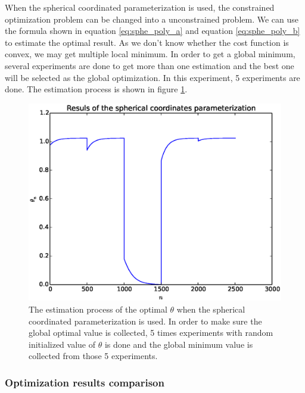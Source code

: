 \documentclass[a4paper,12pt]{article}
\begin{document}
When the spherical coordinated parameterization is used, the constrained optimization problem can be changed into a unconstrained problem. We can use the formula shown in equation \ref{eq:sphe_poly_a} and equation \ref{eq:sphe_poly_b} to estimate the optimal result. As we don't know whether the cost function is convex, we may get multiple local minimum. In order to get a global minimum, several experiments are done to get more than one estimation and the best one will be selected as the global optimization. In this experiment, 5 experiments are done. The estimation process is  shown in figure \ref{fig:polynomial_est_res_sphe}.\\



\begin{figure}[H]
\begin{center}
\includegraphics[width=1.0\linewidth]{polynomial_est_sphe.eps}


\end{center}
   \caption{The estimation process of the optimal $\theta$ when the spherical coordinated parameterization is used. In order to make sure the global optimal value is collected, 5 times experiments with random initialized value of $\theta$ is done and the global minimum value is collected from those 5 experiments.}
\label{fig:polynomial_est_res_sphe}
\end{figure}
\subsubsection{Optimization results comparison}
\end{document}
